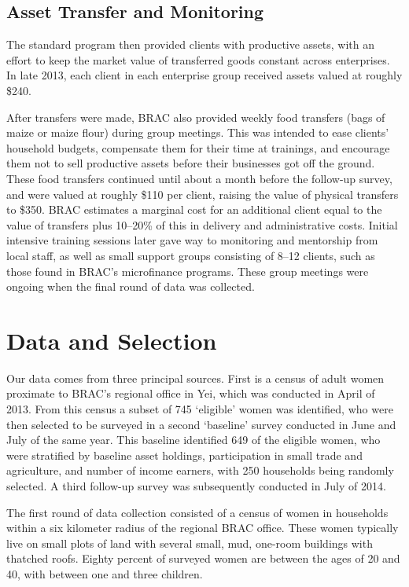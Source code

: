 \documentclass[12pt,letterpaper]{article}
\begin{document}
\subsection{Asset Transfer and Monitoring}
\label{sec:orgheadline4}

The standard program then provided clients with productive assets,
with an effort to keep the market value of transferred goods constant
across enterprises. In late 2013, each client in each enterprise group
received assets valued at roughly \$240.

After transfers were made, BRAC also provided weekly food transfers
(bags of maize or maize flour) during group meetings. This was
intended to ease clients' household budgets, compensate them for
their time at trainings, and encourage them not to sell productive
assets before their businesses got off the ground. These food
transfers continued until about a month before the follow-up survey, and were
valued at roughly \$110 per client, raising the value 
of physical transfers to \$350.  BRAC estimates a marginal cost for
an additional client equal to the value of transfers plus 10--20\% of
this in delivery and administrative costs.  Initial intensive
training sessions later gave way to monitoring and mentorship from
local staff, as well as small support groups consisting of 8--12
clients, such as those found in BRAC's microfinance programs. These group meetings
were ongoing when the final round of data was collected.

\section{Data and Selection}
\label{sec:orgheadline8}

Our data comes from three principal sources.  First is a census of adult women
proximate to BRAC's regional office in Yei, which was conducted in April of 2013.
From this census a subset of 745 `eligible' women was identified, who were then
selected to be surveyed in a second `baseline' survey conducted in June and July of
the same year. This baseline identified 649 of the eligible women, who were
stratified by baseline asset holdings, participation in 
small trade and agriculture, and number of income earners, with 250 households
being randomly selected. A third follow-up survey was subsequently conducted in
July of 2014.

The first round of data collection consisted of a census of women in
households within a six kilometer radius of the regional BRAC
office.  These women typically live on small plots of land with
several small, mud, one-room buildings with thatched roofs.  Eighty
percent of surveyed women are between the ages of 20 and 40, with
between one and three children.
\end{document}
